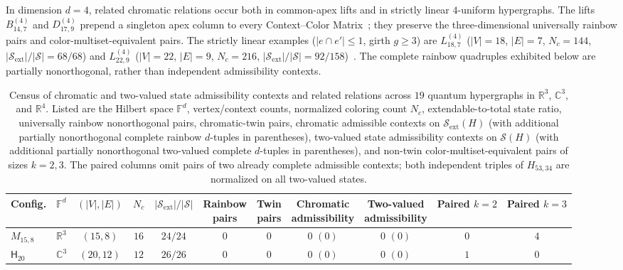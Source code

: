 \documentclass[aps,pra,reprint,superscriptaddress,longbibliography,nofootinbib,floatfix,10pt]{revtex4-2}
\theoremstyle{definition}\newtheorem{definition}[theorem]{Definition}
\theoremstyle{remark}\newtheorem{remark}[theorem]{Remark}
\newcommand{\C}{\mathbb C}\newcommand{\R}{\mathbb R}\newcommand{\Q}{\mathbb Q}
\newcommand{\F}{\mathbb F}\newcommand{\Z}{\mathbb Z}\newcommand{\PP}{\mathbb P}
\newcommand{\Sc}{\mathcal S}\newcommand{\Cc}{\mathcal C}\newcommand{\Wc}{\mathcal W}
\newcommand{\Htwenty}{\mathsf H_{20}}
\begin{document}
In dimension $d=4$, related chromatic relations occur both in common-apex lifts and in strictly linear $4$-uniform hypergraphs. The lifts $B_{14,7}^{(4)}$ and $D_{17,9}^{(4)}$ prepend a singleton apex column to every Context--Color Matrix~\cite[Proposition~2]{2026-latin-context-matrix}; they preserve the three-dimensional universally rainbow pairs and color-multiset-equivalent pairs. The strictly linear examples ($|e\cap e'|\le1$, girth $g\ge3$) are $L_{18,7}^{(4)}$ ($|V|=18$, $|E|=7$, $N_c=144$, $|\Sc_{\mathrm{ext}}|/|\Sc|=68/68$) and $L_{22,9}^{(4)}$ ($|V|=22$, $|E|=9$, $N_c=216$, $|\Sc_{\mathrm{ext}}|/|\Sc|=92/158$)~\cite{svozil2026contexts,2026-latin-context-matrix}. The complete rainbow quadruples exhibited below are partially nonorthogonal, rather than independent admissibility contexts.

\begin{table}[!htbp]
\caption{Census of chromatic and two-valued state admissibility contexts and related relations across $19$ quantum hypergraphs in $\R^3$, $\C^3$, and $\R^4$. Listed are the Hilbert space $\F^d$, vertex/context counts, normalized coloring count $N_c$, extendable-to-total state ratio, universally rainbow nonorthogonal pairs, chromatic-twin pairs, chromatic admissible contexts on $\Sc_{\mathrm{ext}}(H)$ (with additional partially nonorthogonal complete rainbow $d$-tuples in parentheses), two-valued state admissibility contexts on $\Sc(H)$ (with additional partially nonorthogonal two-valued complete $d$-tuples in parentheses), and non-twin color-multiset-equivalent pairs of sizes $k=2,3$. The paired columns omit pairs of two already complete admissible contexts; both independent triples of $H_{53,34}$ are normalized on all two-valued states.}\label{tab:master-chromatic-relations}
\footnotesize\renewcommand{\arraystretch}{1.22}\setlength{\tabcolsep}{3pt}
\begin{ruledtabular}
\begin{tabular}{llccccccccc}
Config. & $\F^d$ & $(|V|,|E|)$ & $N_c$ & $|\Sc_{\mathrm{ext}}|/|\Sc|$ & \shortstack{Rainbow\\pairs} & \shortstack{Twin\\pairs} & \shortstack{Chromatic\\admissibility} & \shortstack{Two-valued\\admissibility} & Paired $k=2$ & Paired $k=3$\\\hline
$M_{15,8}$ & $\R^3$ & $(15,8)$ & $16$ & $24/24$ & $0$ & $0$ & $0$ $(0)$ & $0$ $(0)$ & $0$ & $4$\\
$\Htwenty$ & $\C^3$ & $(20,12)$ & $12$ & $26/26$ & $0$ & $0$ & $0$ $(0)$ & $0$ $(0)$ & $1$ & $0$\\

\end{tabular}
\end{ruledtabular}
\end{table}
\end{document}
